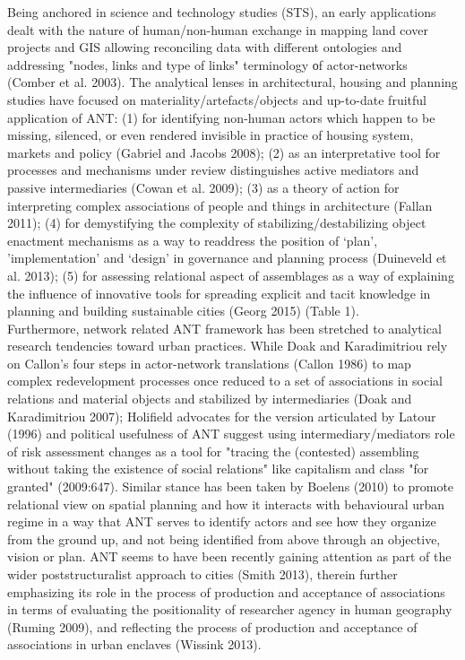 \documentclass[11pt]{report}
\begin{document}
Being anchored in science and technology studies (STS), an early applications dealt with the nature of human/non-human exchange in mapping land cover projects and GIS allowing reconciling data with different ontologies and addressing "nodes, links and type of links" terminology оf actor-networks (Comber et al. 2003). The analytical lenses in architectural, housing and planning studies have focused on materiality/artefacts/objects and up-to-date fruitful application of ANT: (1) for identifying non-human actors which happen to be missing, silenced, or even rendered invisible in practice of housing system, markets and policy (Gabriel and Jacobs 2008); (2) as an interpretative tool for processes and mechanisms under review distinguishes active mediators and passive intermediaries (Cowan et al. 2009); (3) as a theory of action for interpreting complex associations of people and things in architecture (Fallan 2011); (4) for demystifying the complexity of stabilizing/destabilizing object enactment mechanisms as a way to readdress the position of ‘plan’, ’implementation’ and ‘design’ in governance and planning process (Duineveld et al. 2013); (5) for assessing relational aspect of assemblages as a way of explaining the influence of innovative tools for spreading explicit and tacit knowledge in planning and building sustainable cities (Georg 2015) (Table 1).
\\

Furthermore, network related ANT framework has been stretched to analytical research tendencies toward urban practices. While Doak and Karadimitriou rely on Callon’s four steps in actor-network translations  (Callon 1986) to map complex redevelopment processes once reduced to a set of associations in social relations and material objects and stabilized by intermediaries (Doak and Karadimitriou 2007); Holifield  advocates for the version articulated by Latour (1996) and political usefulness of ANT suggest using  intermediary/mediators role of risk assessment changes as a tool for "tracing the (contested) assembling without taking the existence of social relations" like capitalism and class "for granted" (2009:647). Similar stance has been taken by Boelens (2010) to promote relational view on spatial planning and how it interacts with behavioural urban regime in a way that ANT serves to identify actors and see how they organize from the ground up, and not being identified from above through an objective, vision or plan. ANT seems to have been recently gaining attention as part of the wider poststructuralist approach to cities  (Smith 2013), therein further emphasizing its role in the process of production and acceptance of associations in terms of evaluating the positionality of researcher agency in human geography (Ruming 2009), and  reflecting the process of production and acceptance of associations in urban enclaves (Wissink 2013).
\\
\end{document}
